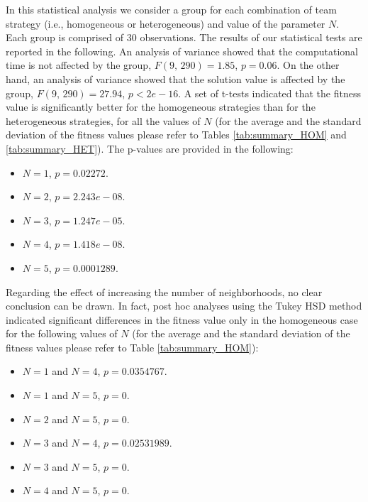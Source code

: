 \documentclass[journal]{IEEEtran}
\begin{document}
In this statistical analysis we consider a group for each combination of team strategy (i.e., homogeneous or heterogeneous) and value of the parameter $N$. Each group is comprised of 30 observations. The results of our statistical tests are reported in the following. An analysis of variance showed that the computational time is not affected by the group, $F(9,\, 290) = 1.85$, $p = 0.06$. On the other hand, an analysis of variance showed that the solution value is affected by the group, $F(9,\, 290) = 27.94$, $p < 2e-16$.  A set of t-tests indicated that the fitness value is significantly better for the homogeneous strategies than for the heterogeneous strategies, for all the values of $N$ (for the average and the standard deviation of the fitness values please refer to Tables \ref{tab:summary_HOM} and \ref{tab:summary_HET}). The p-values are provided in the following:

\begin{itemize}
\item $N=1$, $p = 0.02272$.
\item $N=2$, $p = 2.243e-08$.
\item $N=3$, $p = 1.247e-05$.
\item $N=4$, $p = 1.418e-08$.
\item $N=5$, $p = 0.0001289$.
\end{itemize}

Regarding the effect of increasing the number of neighborhoods, no clear conclusion can be drawn. In fact, post hoc analyses using the Tukey HSD method indicated significant differences in the fitness value only in the homogeneous case for the following values of $N$ (for the average and the standard deviation of the fitness values please refer to Table \ref{tab:summary_HOM}):

\begin{itemize}
\item $N=1$ and $N=4$, $p = 0.0354767$.
\item $N=1$ and $N=5$, $p = 0$.
\item $N=2$ and $N=5$, $p = 0$.
\item $N=3$ and $N=4$, $p = 0.02531989$.
\item $N=3$ and $N=5$, $p = 0$.
\item $N=4$ and $N=5$, $p = 0$.
\end{itemize}
\end{document}
